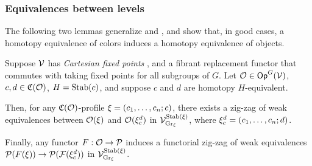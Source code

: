 \documentclass[a4paper,10pt
,draft
]{article}%
\renewcommand{\F}{\mathcal F}
\renewcommand{\1}{\ensuremath{\mathbb{id}}}
\begin{document}
\subsubsection{Equivalences between levels}


The following two lemmas generalize \cite[Prop. 4.14]{Cav14} and \cite[Prop. 2.12]{BM13},
and show that, in good cases, a homotopy equivalence of colors induces a homotopy equivalence of objects.

\begin{lemma}
      \label{CAV_4.14_PROP1}
      Suppose $\mathcal V$ has \textit{Cartesian fixed points} \cite[Def 6.27]{BP17}, and
      a fibrant replacement functor that commutes with taking fixed points for all subgroups of $G$.
      Let $\mathcal{O} \in \mathsf{Op}^G(\mathcal V)$,
      $c,d \in \mathfrak C(\mathcal{O})$, 
      $H = \mathrm{Stab}(c)$, and suppose $c$ and $d$ are homotopy $H$-equivalent.

      Then, for any $\mathfrak C(\mathcal{O})$-profile $\xi = (c_1,\dots, c_n;c)$,
      there exists a zig-zag of weak equivalences between
      $\mathcal{O}(\xi)$ and $\mathcal{O}(\xi_c^d)$
      in $\mathcal V^{\mathrm{Stab}(\xi)}_{\mathrm{Gr}_\xi}$,
      where $\xi_c^d = (c_1,\dots, c_n;d)$.

      Finally, any functor $F: \mathcal{O} \to \mathcal{P}$ induces a functorial zig-zag of weak equivalences
      $\P(F(\ksi)) \to \P(\F(\ksi_c^d))$ in $\mathcal V^{\mathrm{Stab}(\xi)}_{\mathrm{Gr}_\xi}$. 
\end{lemma}
\end{document}
